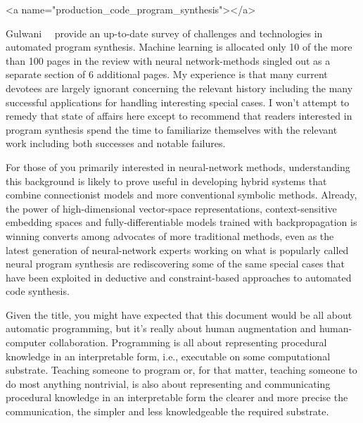 
\rawhtml
<a name="production_code_program_synthesis"></a>
\endrawhtml
{}


Gulwani~\etal{}~\cite{GulwanietalFaTiPL-17} provide an up-to-date survey of challenges and technologies in automated program synthesis. Machine learning is allocated only 10 of the more than 100 pages in the review with neural network-methods singled out as a separate section of 6 additional pages. My experience is that many current devotees are largely ignorant concerning the relevant history including the many successful applications for handling interesting special cases. I won't attempt to remedy that state of affairs here except to recommend that readers interested in program synthesis spend the time to familiarize themselves with the relevant work including both successes and notable failures. 

For those of you primarily interested in neural-network methods, understanding this background is likely to prove useful in developing hybrid systems that combine connectionist models and more conventional symbolic methods. Already, the power of high-dimensional vector-space representations, context-sensitive embedding spaces and fully-differentiable models trained with backpropagation is winning converts among advocates of more traditional methods, even as the latest generation of neural-network experts working on what is popularly called neural program synthesis are rediscovering some of the same special cases that have been exploited in deductive and constraint-based approaches to automated code synthesis.




Given the title, you might have expected that this document would be all about automatic programming, but it's really about human augmentation and human-computer collaboration. Programming is all about representing procedural knowledge in an interpretable form, i.e., executable on some computational substrate. Teaching someone to program or, for that matter, teaching someone to do most anything nontrivial, is also about representing and communicating procedural knowledge in an interpretable form \emdash{} the clearer and more precise the communication, the simpler and less knowledgeable the required substrate.

